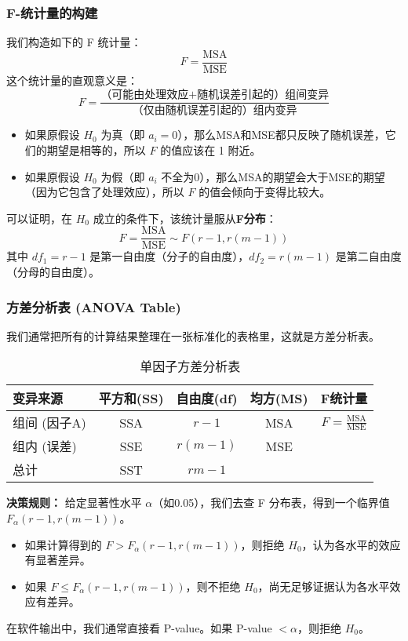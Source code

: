 \documentclass[12pt, a4paper]{amsart}
\begin{document}
\subsubsection{F-统计量的构建}
我们构造如下的 F 统计量：
$$ F = \frac{\text{MSA}}{\text{MSE}} $$
这个统计量的直观意义是：
$$ F = \frac{\text{（可能由处理效应+随机误差引起的）组间变异}}{\text{（仅由随机误差引起的）组内变异}} $$
\begin{itemize}
    \item 如果原假设 $H_0$ 为真（即 $a_i=0$），那么MSA和MSE都只反映了随机误差，它们的期望是相等的，所以 $F$ 的值应该在 1 附近。
    \item 如果原假设 $H_0$ 为假（即 $a_i$ 不全为0），那么MSA的期望会大于MSE的期望（因为它包含了处理效应），所以 $F$ 的值会倾向于变得比较大。
\end{itemize}

可以证明，在 $H_0$ 成立的条件下，该统计量服从\textbf{F分布}：
$$ F = \frac{\text{MSA}}{\text{MSE}} \sim F(r-1, r(m-1)) $$
其中 $df_1 = r-1$ 是第一自由度（分子的自由度），$df_2 = r(m-1)$ 是第二自由度（分母的自由度）。

\subsubsection{方差分析表 (ANOVA Table)}
我们通常把所有的计算结果整理在一张标准化的表格里，这就是方差分析表。
\begin{table}[h!]
\centering
\caption{单因子方差分析表}
\begin{tabular}{lcccc}
\toprule
\textbf{变异来源} & \textbf{平方和(SS)} & \textbf{自由度(df)} & \textbf{均方(MS)} & \textbf{F统计量} \\
\midrule
组间 (因子A) & SSA & $r-1$ & MSA & $F = \frac{\text{MSA}}{\text{MSE}}$ \\
组内 (误差)   & SSE & $r(m-1)$ & MSE & \\
\midrule
总计 & SST & $rm-1$ & & \\
\bottomrule
\end{tabular}
\end{table}

\textbf{决策规则：}
给定显著性水平 $\alpha$（如0.05），我们去查 F 分布表，得到一个临界值 $F_\alpha(r-1, r(m-1))$。
\begin{itemize}
    \item 如果计算得到的 $F > F_\alpha(r-1, r(m-1))$，则拒绝 $H_0$，认为各水平的效应有显著差异。
    \item 如果 $F \le F_\alpha(r-1, r(m-1))$，则不拒绝 $H_0$，尚无足够证据认为各水平效应有差异。
\end{itemize}
在软件输出中，我们通常直接看 P-value。如果 P-value $< \alpha$，则拒绝 $H_0$。
\end{document}
